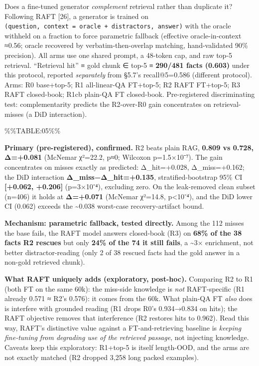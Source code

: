 Does a fine-tuned generator \emph{complement} retrieval rather than duplicate it? Following RAFT {[}26{]}, a generator is trained on \texttt{(question,\ context\ =\ oracle\ +\ distractors,\ answer)} with the oracle withheld on a fraction to force parametric fallback (effective oracle-in-context ≈0.56; oracle recovered by verbatim-then-overlap matching, hand-validated 90\% precision). All arms use one shared prompt, a 48-token cap, and raw top-5 retrieval. ``Retrieval hit'' ≡ gold chunk ∈ top-5 ≡ \textbf{290/481 facts (0.603)} under this protocol, reported \emph{separately} from §5.7's recall@5=0.586 (different protocol). Arms: R0 base+top-5; R1 all-linear-QA FT+top-5; R2 RAFT FT+top-5; R3 RAFT closed-book; R1cb plain-QA FT closed-book. Pre-registered discriminating test: complementarity predicts the R2-over-R0 gain concentrates on retrieval-misses (a DiD interaction).

\%\%TABLE:05\%\%

\textbf{Primary (pre-registered), confirmed.} R2 beats plain RAG, \textbf{0.809 vs 0.728, Δ=+0.081} (McNemar χ²=22.2, p≈0; Wilcoxon p=1.5×10⁻⁷). The gain concentrates on misses exactly as predicted: Δ\_hit=+0.028, Δ\_miss=+0.162; the DiD interaction \textbf{Δ\_miss−Δ\_hit=+0.135}, stratified-bootstrap 95\% CI \textbf{{[}+0.062, +0.206{]}} (p=3×10⁻⁴), excluding zero. On the leak-removed clean subset (n=406) it holds at \textbf{Δ=+0.071} (McNemar χ²=14.8, p\textless10⁻⁴), and the DiD lower CI (0.062) exceeds the \textasciitilde0.038 worst-case recovery-artifact bound.

\textbf{Mechanism: parametric fallback, tested directly.} Among the 112 misses the base fails, the RAFT model answers closed-book (R3) on \textbf{68\% of the 38 facts R2 rescues} but only \textbf{24\% of the 74 it still fails}, a \textasciitilde3× enrichment, not better distractor-reading (only 2 of 38 rescued facts had the gold answer in a non-gold retrieved chunk).

\textbf{What RAFT uniquely adds (exploratory, post-hoc).} Comparing R2 to R1 (both FT on the same 60k): the miss-side knowledge is \emph{not} RAFT-specific (R1 already 0.571 ≈ R2's 0.576): it comes from the 60k. What plain-QA FT \emph{also} does is interfere with grounded reading (R1 drops R0's 0.934→0.834 on hits); the RAFT objective removes that interference (R2 restores hits to 0.962). Read this way, RAFT's distinctive value against a FT-and-retrieving baseline is \emph{keeping fine-tuning from degrading use of the retrieved passage}, not injecting knowledge. Caveats keep this exploratory: R1+top-5 is itself length-OOD, and the arms are not exactly matched (R2 dropped 3,258 long packed examples).

